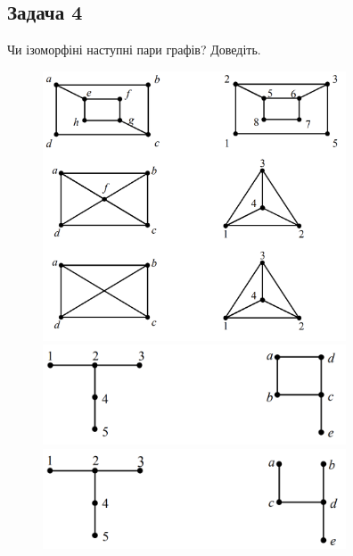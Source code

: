 \documentclass{article}
\begin{document}
\subsection*{Задача 4}
Чи ізоморфіні наступні пари графів? Доведіть.

\begin{figure}[h]
\centering
\includegraphics[width=90mm]{h1}
\includegraphics[width=90mm]{h2}
\includegraphics[width=90mm]{h3}
\end{figure}
\end{document}
